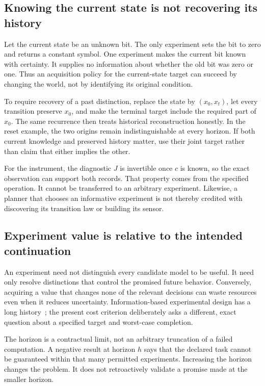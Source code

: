 \subsection{Knowing the current state is not recovering its history}
\begin{MUcounterexample}\label{MU:ex:reset-knowledge}
Let the current state be an unknown bit. The only experiment sets the bit to zero and returns a constant symbol. One experiment makes the current bit known with certainty. It supplies no information about whether the old bit was zero or one. Thus an acquisition policy for the current-state target can succeed by changing the world, not by identifying its original condition.
\end{MUcounterexample}

To require recovery of a past distinction, replace the state by $(x_0,x_t)$, let every transition preserve $x_0$, and make the terminal target include the required part of $x_0$. The same recurrence then treats historical reconstruction honestly. In the reset example, the two origins remain indistinguishable at every horizon. If both current knowledge and preserved history matter, use their joint target rather than claim that either implies the other.

For the instrument, the diagnostic $J$ is invertible once $c$ is known, so the exact observation can support both records. That property comes from the specified operation. It cannot be transferred to an arbitrary experiment. Likewise, a planner that chooses an informative experiment is not thereby credited with discovering its transition law or building its sensor.

\subsection{Experiment value is relative to the intended continuation}
An experiment need not distinguish every candidate model to be useful. It need only resolve distinctions that control the promised future behavior. Conversely, acquiring a value that changes none of the relevant decisions can waste resources even when it reduces uncertainty. Information-based experimental design has a long history~\cite{MU:lindley}; the present cost criterion deliberately asks a different, exact question about a specified target and worst-case completion.

The horizon is a contractual limit, not an arbitrary truncation of a failed computation. A negative result at horizon $h$ says that the declared task cannot be guaranteed within that many permitted experiments. Increasing the horizon changes the problem. It does not retroactively validate a promise made at the smaller horizon.


